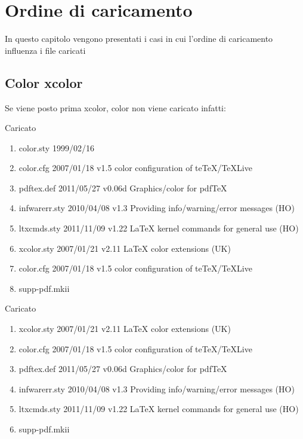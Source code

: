 \chapter{Ordine di caricamento}
In questo capitolo vengono presentati i casi in cui l'ordine di caricamento influenza i file caricati
\section{Color xcolor}
Se viene posto prima xcolor, color non viene caricato infatti: 

Caricato 
\begin{enumerate}
\item color.sty 1999/02/16
\item color.cfg 2007/01/18 v1.5 color configuration of teTeX/TeXLive
\item pdftex.def 2011/05/27 v0.06d Graphics/color for pdfTeX
\item infwarerr.sty 2010/04/08 v1.3 Providing info/warning/error messages (HO)
\item ltxcmds.sty 2011/11/09 v1.22 LaTeX kernel commands for general use (HO)
\item xcolor.sty 2007/01/21 v2.11 LaTeX color extensions (UK)
\item color.cfg 2007/01/18 v1.5 color configuration of teTeX/TeXLive
\item supp-pdf.mkii
\end{enumerate}

Caricato 
\begin{enumerate}
\item xcolor.sty 2007/01/21 v2.11 LaTeX color extensions (UK)
\item color.cfg 2007/01/18 v1.5 color configuration of teTeX/TeXLive
\item pdftex.def 2011/05/27 v0.06d Graphics/color for pdfTeX
\item infwarerr.sty 2010/04/08 v1.3 Providing info/warning/error messages (HO)
\item ltxcmds.sty 2011/11/09 v1.22 LaTeX kernel commands for general use (HO)
\item supp-pdf.mkii
\end{enumerate}
